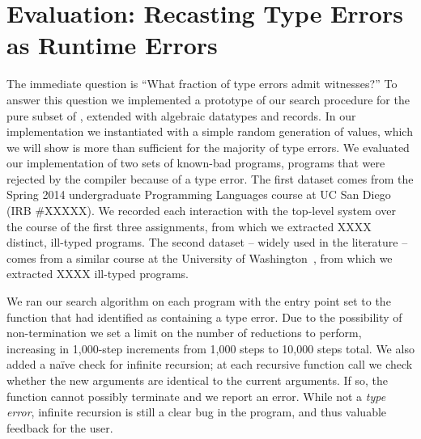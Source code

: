 \section{Evaluation: Recasting Type Errors as Runtime Errors}
\label{sec:eval-witness}
%
The immediate question is ``What fraction of type errors admit
witnesses?''
%
To answer this question we implemented a prototype of our search
procedure for the pure subset of \ocaml, \ie \lang extended with
algebraic datatypes and records. 
%
In our implementation we instantiated \gensym with a simple random
generation of values, which we will show is more than sufficient for the
majority of type errors.
%
We evaluated our implementation of two sets of known-bad programs, \ie
programs that were rejected by the \ocaml compiler because of a type
error.
%
The first dataset comes from the Spring 2014 undergraduate Programming
Languages course at UC San Diego (IRB \#XXXXX). 
%
We recorded each interaction with the \ocaml top-level system over the
course of the first three assignments, from which we extracted XXXX
distinct, ill-typed \ocaml programs.
%
The second dataset -- widely used in the literature -- comes from a
similar course at the University of Washington~\cite{XXXXX}, from which
we extracted XXXX ill-typed programs.

We ran our search algorithm on each program with the entry point set to
the function that \ocaml had identified as containing a type error. 
%
Due to the possibility of non-termination we set a limit on the number
of reductions to perform, increasing in 1,000-step increments from 1,000
steps to 10,000 steps total.
%
We also added a na\"ive check for infinite recursion; at each recursive
function call we check whether the new arguments are identical to the
current arguments.
%
If so, the function cannot possibly terminate and we report an error.
%
While not a \emph{type error}, infinite recursion is still a clear bug
in the program, and thus valuable feedback for the user.

